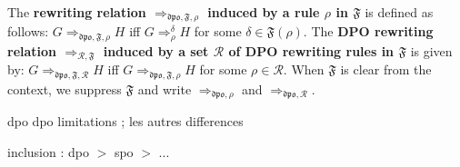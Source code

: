 \begin{definition}
  The \textbf{rewriting relation $\mathop{\Rightarrow}_{\mathfrak{dpo},\mathfrak{F},\rho}$ induced by a rule $\rho$ in $\mathfrak{F}$} is defined as follows: $G \mathop{\Rightarrow}_{\mathfrak{dpo},\mathfrak{F},\rho} H$ iff $G \mathop{\Rightarrow}_\rho^\delta H$ for some $\delta \mathop{\in} \mathfrak{F}(\rho)$. 
     The \textbf{DPO rewriting relation $\mathop{\Rightarrow}_{\mathcal{R},\mathfrak{F}}$ induced by a set $\mathcal{R}$ of DPO rewriting rules in $\mathfrak{F}$} is given by: $G \mathop{\Rightarrow}_{\mathfrak{dpo}, \mathfrak{F},\mathcal{R}} H$ iff $G \mathop{\Rightarrow}_{\mathfrak{dpo},\mathfrak{F}, \rho} H$ for some $\rho \mathop{\in} \mathcal{R}$. When $\mathfrak{F}$ is clear from the context, we 
    suppress $\mathfrak{F}$ and 
    write $\mathop{\Rightarrow}_{\mathfrak{dpo},\rho}$ and $\mathop{\Rightarrow}_{\mathfrak{dpo},\mathcal{R}}$.
\end{definition}
\color{red}    


dpo
dpo limitations ;
les autres differences

\begin{proposition}[to do]
    inclusion : dpo $>$ spo $>$ ...
\end{proposition}

